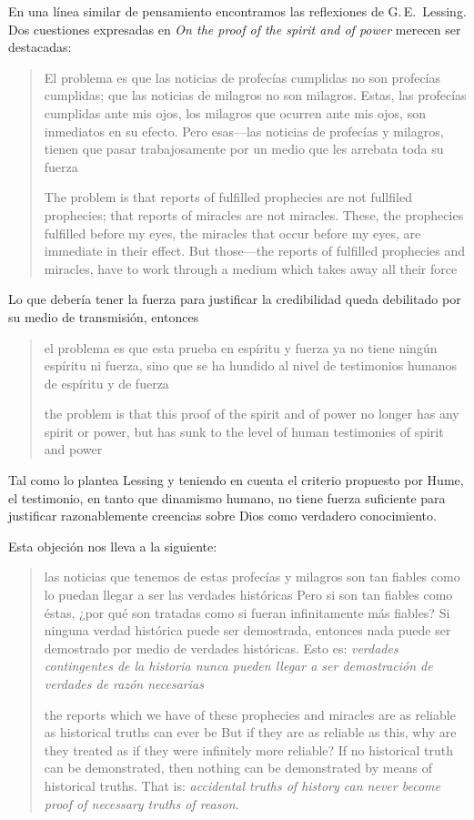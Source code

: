 En una línea similar de pensamiento encontramos las reflexiones de
G.\,E.~Lessing. Dos cuestiones expresadas en \emph{On the proof of the spirit
  and of power} merecen ser destacadas:

\blockquote[The problem is that reports of fulfilled prophecies are not
fullfiled prophecies; that reports of miracles are not miracles. These, the
prophecies fulfilled before my eyes, the miracles that occur before my eyes, are
immediate in their effect. But those---the reports of fulfilled prophecies and
miracles, have to work through a medium which takes away all their force]{El
  problema es que las noticias de profecías cumplidas no son profecías
  cumplidas; que las noticias de milagros no son milagros. Estas, las profecías
  cumplidas ante mis ojos, los milagros que ocurren ante mis ojos, son
  inmediatos en su efecto. Pero esas---las noticias de profecías y milagros,
  tienen que pasar trabajosamente por un medio que les arrebata toda su fuerza}

Lo que debería tener la fuerza para justificar la credibilidad queda debilitado
por su medio de transmisión, entonces

\blockquote[the problem is that this proof of the spirit and of power no longer
has any spirit or power, but has sunk to the level of human testimonies of
spirit and power]{el problema es que esta prueba en espíritu y fuerza ya no
  tiene ningún espíritu ni fuerza, sino que se ha hundido al nivel de
  testimonios humanos de espíritu y de fuerza}.

Tal como lo plantea Lessing y teniendo en cuenta el criterio propuesto por Hume,
el testimonio, en tanto que dinamismo humano, no tiene fuerza suficiente para
justificar razonablemente creencias sobre Dios como verdadero conocimiento.

Esta objeción nos lleva a la siguiente:

\blockquote[the reports which we have of these prophecies and miracles are as
reliable as historical truths can ever be \textelp{} But if they are as reliable
as this, why are they treated as if they were infinitely more reliable?
\textelp{} If no historical truth can be demonstrated, then nothing can be
demonstrated by means of historical truths. That is: \emph{accidental truths of
  history can never become proof of necessary truths of reason.}]{las noticias
  que tenemos de estas profecías y milagros son tan fiables como lo puedan
  llegar a ser las verdades históricas \textelp{} Pero si son tan fiables como
  éstas, ¿por qué son tratadas como si fueran infinitamente más fiables?
  \textelp{} Si ninguna verdad histórica puede ser demostrada, entonces nada
  puede ser demostrado por medio de verdades históricas. Esto es: \emph{verdades
    contingentes de la historia nunca pueden llegar a ser demostración de
    verdades de razón necesarias}}

